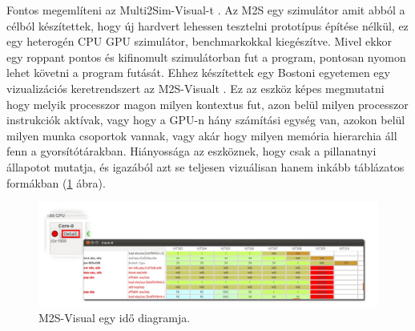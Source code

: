 Fontos megemlíteni az Multi2Sim-Visual-t \cite{m2s}. Az M2S egy szimulátor amit abból a célból készítettek, hogy új hardvert lehessen tesztelni prototípus építése nélkül, ez egy heterogén CPU GPU szimulátor, benchmarkokkal kiegészítve. Mivel ekkor egy roppant pontos és kifinomult szimulátorban fut a program, pontosan nyomon lehet követni a program futását. Ehhez készítettek egy Bostoni egyetemen egy vizualizációs keretrendszert az M2S-Visualt \cite{m2sv}. Ez az eszköz képes megmutatni hogy melyik processzor magon milyen kontextus fut, azon belül milyen processzor instrukciók aktívak, vagy hogy a GPU-n hány számítási egység van, azokon belül milyen munka csoportok vannak, vagy akár hogy milyen memória hierarchia áll fenn a gyorsítótárakban.
Hiányossága az eszköznek, hogy csak a pillanatnyi állapotot mutatja, és igazából azt se teljesen vizuálisan hanem inkább táblázatos formákban (\ref{fig:m2svf} ábra).

\begin{figure}[h]
\centering
\includegraphics[scale=0.5]{images/m2sv2.jpg}
\caption{M2S-Visual egy idő diagramja. \cite{m2sv}}
\label{fig:m2svf}
\end{figure}

